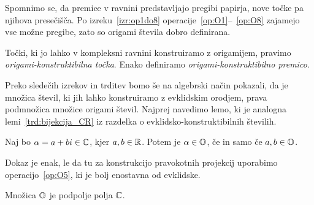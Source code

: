 Spomnimo se, da premice v ravnini predstavljajo pregibi papirja, nove točke pa njihova presečišča. Po izreku~\ref{izr:op1do8} operacije~\ref{op:O1}--~\ref{op:O8} zajamejo vse možne pregibe, zato so origami števila dobro definirana.

\begin{definicija}
    Točki, ki jo lahko v kompleksni ravnini konstruiramo z origamijem, pravimo \emph{origami-konstruktibilna točka}. Enako definiramo \emph{origami-konstruktibilno premico}.
\end{definicija}

Preko sledečih izrekov in trditev bomo še na algebrski način pokazali, da je množica števil, ki jih lahko konstruiramo z evklidskim orodjem, prava podmnožica množice origami števil. Najprej navedimo lemo, ki je analogna lemi~\ref{trd:bijekcija_CR} iz razdelka o evklidsko-konstruktibilnih številih.

\begin{lema}
    \label{trd:zaprt_koord}
    Naj bo $\alpha = a + bi \in \mathbb C$, kjer $a, b \in \mathbb R$. Potem je $\alpha \in \mathbb O$, če in samo če $a, b \in \mathbb O$.
\end{lema}
Dokaz je enak, le da tu za konstrukcijo pravokotnih projekcij uporabimo operacijo~\ref{op:O5}, ki je bolj enostavna od evklidske.

\begin{izrek}
    \label{izr:podpolje}
    Množica $\mathbb O$ je podpolje polja $\mathbb C$.
\end{izrek}

